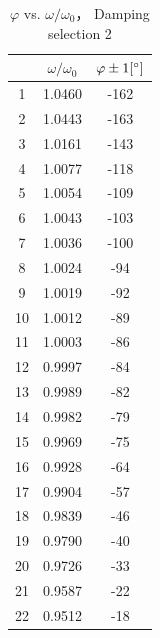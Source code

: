 \begin{table}[H]
\centering
\begin{tabular}{|c|c|c|}
\hline
& $\omega/\omega_0$ &  $\varphi \pm 1 [^\circ] $ \\ \hline
1  & 1.0460  & -162  \\ \hline
2  & 1.0443  & -163  \\ \hline
3  & 1.0161  & -143  \\ \hline
4  & 1.0077  & -118  \\ \hline
5  & 1.0054  & -109  \\ \hline
6  & 1.0043  & -103  \\ \hline
7  & 1.0036  & -100  \\ \hline
8  & 1.0024  & -94   \\ \hline
9  & 1.0019  & -92   \\ \hline
10 & 1.0012  & -89   \\ \hline
11 & 1.0003  & -86   \\ \hline
12 & 0.9997  & -84   \\ \hline
13 & 0.9989  & -82   \\ \hline
14 & 0.9982  & -79   \\ \hline
15 & 0.9969  & -75   \\ \hline
16 & 0.9928  & -64   \\ \hline
17 & 0.9904  & -57   \\ \hline
18 & 0.9839  & -46   \\ \hline
19 & 0.9790  & -40   \\ \hline
20 & 0.9726  & -33   \\ \hline
21 & 0.9587  & -22   \\ \hline
22 & 0.9512  & -18   \\ \hline
\end{tabular}    
\caption{$\varphi$ vs. $\omega/\omega_0$， Damping selection 2}\label{data_phi2}
\end{table}

